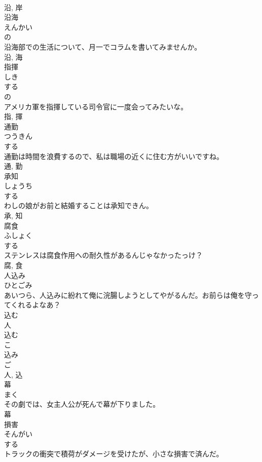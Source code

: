 \documentclass[8pt]{extreport}
\begin{document}
\begin{CJK}{UTF8}{min}
\\	沿, 岸	
\\	沿海	
\\	えんかい	
\\	の 
\\	沿海部での生活について、月一でコラムを書いてみませんか。	
\\	沿, 海	
\\	指揮	
\\	しき	
\\	する 
\\	の 
\\	アメリカ軍を指揮している司令官に一度会ってみたいな。	
\\	指, 揮	
\\	通勤	
\\	つうきん	
\\	する 
\\	通勤は時間を浪費するので、私は職場の近くに住む方がいいですね。	
\\	通, 勤	
\\	承知	
\\	しょうち	
\\	する 
\\	わしの娘がお前と結婚することは承知できん。	
\\	承, 知	
\\	腐食	
\\	ふしょく	
\\	する 
\\	ステンレスは腐食作用への耐久性があるんじゃなかったっけ？	
\\	腐, 食	
\\	人込み	
\\	ひとごみ	
\\	あいつら、人込みに紛れて俺に浣腸しようとしてやがるんだ。お前らは俺を守ってくれるよなあ？	
\\	込む 
\\	人 
\\	込む 
\\	こ 
\\	込み 
\\	ご 
\\	人, 込	
\\	幕	
\\	まく	
\\	その劇では、女主人公が死んで幕が下りました。	
\\	幕	
\\	損害	
\\	そんがい	
\\	する 
\\	トラックの衝突で積荷がダメージを受けたが、小さな損害で済んだ。	

\end{CJK}
\end{document}
